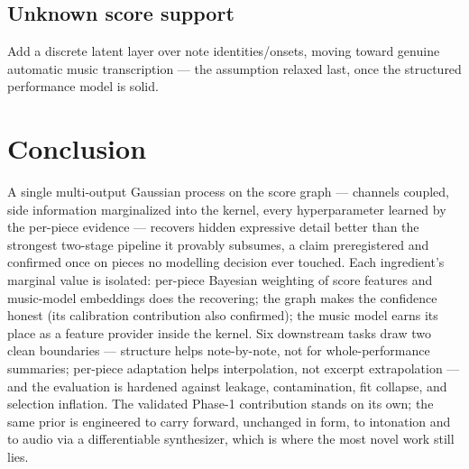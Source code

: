 \documentclass[11pt,a4paper]{report}
\begin{document}
\section{Unknown score support}\label{sec:future-amt}
Add a discrete latent layer over note identities/onsets, moving toward genuine
automatic music transcription --- the assumption relaxed last, once the structured
performance model is solid.

\chapter{Conclusion}\label{ch:conclusion}
A single multi-output Gaussian process on the score graph --- channels coupled,
side information marginalized into the kernel, every hyperparameter learned by the
per-piece evidence --- recovers hidden expressive detail better than the strongest
two-stage pipeline it provably subsumes, a claim preregistered and confirmed once
on pieces no modelling decision ever touched. Each ingredient's marginal value is
isolated: per-piece Bayesian weighting of score features and music-model
embeddings does the recovering; the graph makes the confidence honest (its
calibration contribution also confirmed); the music model earns its place as a
feature provider inside the kernel. Six downstream tasks draw two clean boundaries
--- structure helps note-by-note, not for whole-performance summaries; per-piece
adaptation helps interpolation, not excerpt extrapolation --- and the evaluation is
hardened against leakage, contamination, fit collapse, and selection inflation.
The validated Phase-1 contribution stands on its own; the same prior is engineered
to carry forward, unchanged in form, to intonation and to audio via a
differentiable synthesizer, which is where the most novel work still lies.

\appendix
\end{document}
